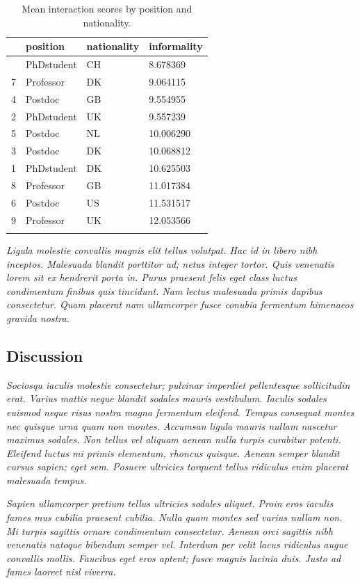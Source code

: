 \documentclass[
  a4paper,
]{scrbook}
\begin{document}
\begin{longtable}[]{@{}llll@{}}

\toprule\noalign{}
& position & nationality & informality \\
\midrule\noalign{}
\endhead
\bottomrule\noalign{}
\endlastfoot
0 & PhDstudent & CH & 8.678369 \\
7 & Professor & DK & 9.064115 \\
4 & Postdoc & GB & 9.554955 \\
2 & PhDstudent & UK & 9.557239 \\
5 & Postdoc & NL & 10.006290 \\
3 & Postdoc & DK & 10.068812 \\
1 & PhDstudent & DK & 10.625503 \\
8 & Professor & GB & 11.017384 \\
6 & Postdoc & US & 11.531517 \\
9 & Professor & UK & 12.053566 \\


\caption{\label{tbl-mean-informality}Mean interaction scores by position
and nationality.}

\tabularnewline
\end{longtable}

\emph{Ligula molestie convallis magnis elit tellus volutpat. Hac id in
libero nibh inceptos. Malesuada blandit porttitor ad; netus integer
tortor. Quis venenatis lorem sit ex hendrerit porta in. Purus praesent
felis eget class luctus condimentum finibus quis tincidunt. Nam lectus
malesuada primis dapibus consectetur. Quam placerat nam ullamcorper
fusce conubia fermentum himenaeos gravida nostra.}

\subsection{Discussion}\label{discussion}

\emph{Sociosqu iaculis molestie consectetur; pulvinar imperdiet
pellentesque sollicitudin erat. Varius mattis neque blandit sodales
mauris vestibulum. Iaculis sodales euismod neque risus nostra magna
fermentum eleifend. Tempus consequat montes nec quisque urna quam non
montes. Accumsan ligula mauris nullam nascetur maximus sodales. Non
tellus vel aliquam aenean nulla turpis curabitur potenti. Eleifend
luctus mi primis elementum, rhoncus quisque. Aenean semper blandit
cursus sapien; eget sem. Posuere ultricies torquent tellus ridiculus
enim placerat malesuada tempus.}

\emph{Sapien ullamcorper pretium tellus ultricies sodales aliquet. Proin
eros iaculis fames mus cubilia praesent cubilia. Nulla quam montes sed
varius nullam non. Mi turpis sagittis ornare condimentum consectetur.
Aenean orci sagittis nibh venenatis natoque bibendum semper vel.
Interdum per velit lacus ridiculus augue convallis mollis. Faucibus eget
eros aptent; fusce magnis lacinia duis. Justo ad fames laoreet nisl
viverra.}
\end{document}
